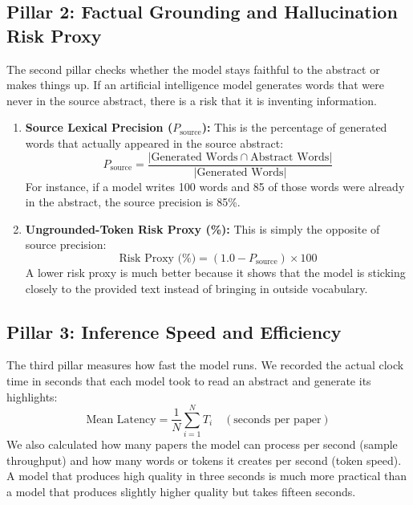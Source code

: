 \documentclass[11pt,a4paper]{article}
\begin{document}
\subsection{Pillar 2: Factual Grounding and Hallucination Risk Proxy}
The second pillar checks whether the model stays faithful to the abstract or makes things up. If an artificial intelligence model generates words that were never in the source abstract, there is a risk that it is inventing information.
\begin{enumerate}
    \item \textbf{Source Lexical Precision ($P_{\text{source}}$):} This is the percentage of generated words that actually appeared in the source abstract:
    \begin{equation}
        P_{\text{source}} = \frac{|\text{Generated Words} \cap \text{Abstract Words}|}{|\text{Generated Words}|}
    \end{equation}
    For instance, if a model writes 100 words and 85 of those words were already in the abstract, the source precision is 85\%.
    \item \textbf{Ungrounded-Token Risk Proxy (\%):} This is simply the opposite of source precision:
    \begin{equation}
        \text{Risk Proxy (\%)} = (1.0 - P_{\text{source}}) \times 100
    \end{equation}
    A lower risk proxy is much better because it shows that the model is sticking closely to the provided text instead of bringing in outside vocabulary.
\end{enumerate}

\subsection{Pillar 3: Inference Speed and Efficiency}
The third pillar measures how fast the model runs. We recorded the actual clock time in seconds that each model took to read an abstract and generate its highlights:
\begin{equation}
    \text{Mean Latency} = \frac{1}{N} \sum_{i=1}^{N} T_i \quad (\text{seconds per paper})
\end{equation}
We also calculated how many papers the model can process per second (sample throughput) and how many words or tokens it creates per second (token speed). A model that produces high quality in three seconds is much more practical than a model that produces slightly higher quality but takes fifteen seconds.

\end{document}
